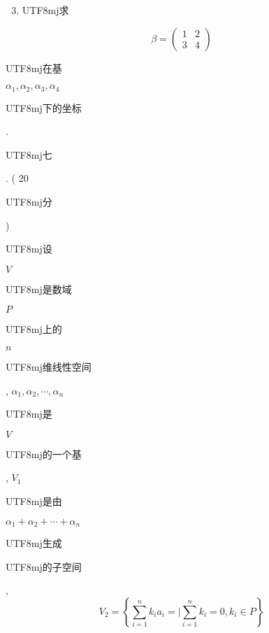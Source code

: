 \documentclass[10pt]{article}
\begin{document}
\begin{enumerate}
  \setcounter{enumi}{2}
  \item \begin{CJK}{UTF8}{mj}求\end{CJK}
\end{enumerate}
$$
\beta=\left(\begin{array}{ll}
1 & 2 \\
3 & 4
\end{array}\right)
$$
\begin{CJK}{UTF8}{mj}在基\end{CJK} $\alpha_{1}, \alpha_{2}, \alpha_{3}, \alpha_{4}$ \begin{CJK}{UTF8}{mj}下的坐标\end{CJK}.

\begin{CJK}{UTF8}{mj}七\end{CJK}. ( 20 \begin{CJK}{UTF8}{mj}分\end{CJK}) \begin{CJK}{UTF8}{mj}设\end{CJK} $V$ \begin{CJK}{UTF8}{mj}是数域\end{CJK} $P$ \begin{CJK}{UTF8}{mj}上的\end{CJK} $n$ \begin{CJK}{UTF8}{mj}维线性空间\end{CJK}, $\alpha_{1}, \alpha_{2}, \cdots, \alpha_{n}$ \begin{CJK}{UTF8}{mj}是\end{CJK} $V$ \begin{CJK}{UTF8}{mj}的一个基\end{CJK}, $V_{1}$ \begin{CJK}{UTF8}{mj}是由\end{CJK} $\alpha_{1}+\alpha_{2}+\cdots+\alpha_{n}$ \begin{CJK}{UTF8}{mj}生成\end{CJK} \begin{CJK}{UTF8}{mj}的子空间\end{CJK},
$$
V_{2}=\left\{\sum_{i=1}^{n} k_{i} a_{i}=\mid \sum_{i=1}^{n} k_{i}=0, k_{i} \in P\right\}
$$
\end{document}
